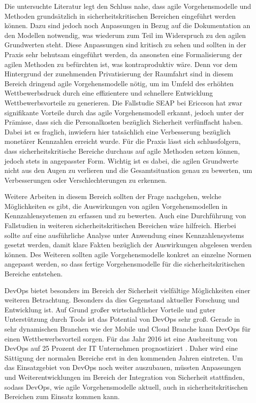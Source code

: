Die untersuchte Literatur legt den Schluss nahe, dass agile Vorgehensmodelle und Methoden grundsätzlich in sicherheitskritischen Bereichen eingeführt werden können.
Dazu sind jedoch noch Anpassungen in Bezug auf die Dokumentation an den Modellen notwendig, was wiederum zum Teil im Widerspruch zu den agilen Grundwerten steht.
Diese Anpassungen sind kritisch zu sehen und sollten in der Praxis sehr behutsam eingeführt werden, da ansonsten eine Formalisierung der agilen Methoden zu befürchten ist, was kontraproduktiv wäre.
Denn vor dem Hintergrund der zunehmenden Privatisierung der Raumfahrt sind in diesem Bereich dringend agile Vorgehensmodelle nötig, um im Umfeld des erhöhten Wettbewerbsdruck durch eine effizientere und schnellere Entwicklung Wettbewerbsvorteile zu generieren.
Die Fallstudie SEAP bei Ericcson hat zwar signifikante Vorteile durch das agile Vorgehensmodell erkannt, jedoch unter der Prämisse, dass sich die Personalkosten bezüglich Sicherheit verfünffacht haben.
Dabei ist es fraglich, inwiefern hier tatsächlich eine Verbesserung bezüglich monetärer Kennzahlen erreicht wurde.
Für die Praxis lässt sich schlussfolgern, dass sicherheitskritische Bereiche durchaus auf agile Methoden setzen können, jedoch stets in angepasster Form.
Wichtig ist es dabei, die agilen Grundwerte nicht aus den Augen zu verlieren und die Gesamtsituation genau zu bewerten, um Verbesserungen oder Verschlechterungen zu erkennen.

Weitere Arbeiten in diesem Bereich sollten der Frage nachgehen, welche Möglichkeiten es gibt, die Auswirkungen von agilen Vorgehensmodellen in Kennzahlensystemen zu erfassen und zu bewerten.
Auch eine Durchführung von Fallstudien in weiteren sicherheitskritischen Bereichen wäre hilfreich. 
Hierbei sollte auf eine ausführliche Analyse unter Anwendung eines Kennzahlensystems gesetzt werden, damit klare Fakten bezüglich der Auswirkungen abgelesen werden können.
Des Weiteren sollten agile Vorgehensmodelle konkret an einzelne Normen angepasst werden, so dass fertige Vorgehensmodelle für die sicherheitskritischen Bereiche entstehen.

DevOps bietet besonders im Bereich der Sicherheit vielfältige Möglichkeiten einer weiteren Betrachtung. Besonders da dies Gegenstand aktueller Forschung und Entwicklung ist. Auf Grund großer wirtschaftlicher Vorteile und guter Unterstützung durch Tools ist das Potential von DevOps sehr groß. Gerade in sehr dynamischen Branchen wie der Mobile und Cloud Branche kann DevOps für einen Wettbewerbsvorteil sorgen. Für das Jahr 2016 ist eine Ausbreitung von DevOps auf 25 Prozent der IT Unternehmen prognostiziert \parencite[vgl.][]{Gartner:2015}. Daher wird eine Sättigung der normalen Bereiche erst in den kommenden Jahren eintreten. Um das Einsatzgebiet von DevOps noch weiter auszubauen, müssten Anpassungen und Weiterentwicklungen im Bereich der Integration von Sicherheit stattfinden, sodass DevOps, wie agile Vorgehensmodelle aktuell, auch in sicherheitskritischen Bereichen zum Einsatz kommen kann.